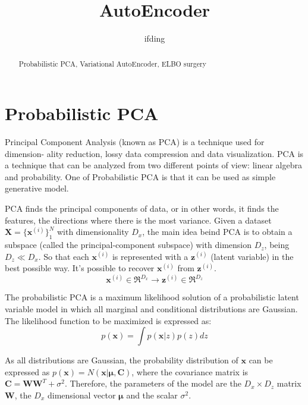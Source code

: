 \documentclass[5p,sort&compress]{elsarticle}
\begin{document}
\begin{frontmatter}
    \title{AutoEncoder}
    \author{ifding}
    
    \begin{abstract}
        Probabilistic PCA, Variational AutoEncoder, ELBO surgery
    \end{abstract}


\end{frontmatter}


\section{Probabilistic PCA}

Principal Component Analysis (known as PCA) is a technique used for dimension-
ality reduction, lossy data compression and data visualization. PCA is a technique that can be analyzed from two different points of view: linear algebra and probability. One of Probabilistic PCA is that it can be used as simple generative model.

PCA finds the principal components of data, or in other words, it finds the features, the directions where there is the most variance. Given a dataset $\mathbf{X}=\{\mathbf{x}^{(i)}\}_1^N$ with dimensionality $D_x$, the main idea beind PCA is to obtain a subspace (called the principal-component subspace) with dimension $D_z$, being $D_z \ll D_x$. So that each $\mathbf{x}^{(i)}$ is represented with a $\mathbf{z}^{(i)}$ (latent variable) in the best possible way. It's possible to recover $\mathbf{x}^{(i)}$ from $\mathbf{z}^{(i)}$.
\begin{equation}
\boldsymbol{x}^{(i)} \in \Re^{D_{x}} \rightarrow \boldsymbol{z}^{(i)} \in \Re^{D_{z}}
\end{equation}

The probabilistic PCA is a maximum likelihood solution of a probabilistic latent variable model in which all marginal and conditional distributions are Gaussian. The likelihood function to be maximized is expressed as:
\begin{equation}
p(\boldsymbol{x})=\int p(\boldsymbol{x} | z) p(z) d z
\end{equation}

As all distributions are Gaussian, the probability distribution of $\boldsymbol{x}$ can be expressed as $p(\boldsymbol{x}) = N(\boldsymbol{x} | \boldsymbol{\mu}, \boldsymbol{C})$, where the covariance matrix is $\boldsymbol{C} = \boldsymbol{W}\boldsymbol{W}^T + \sigma^2$. Therefore, the parameters of the model are the $D_x \times D_z$ matrix $\boldsymbol{W}$, the $D_x$ dimensional vector $\boldsymbol{\mu}$ and the scalar $\sigma^2$.
\end{document}
